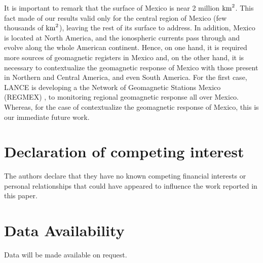\documentclass[a4paper,fleqn]{cas-dc}
\begin{document}

It is important to remark that the surface of Mexico is near 2 million ${\rm km}^2$. This fact made of our results valid only for the central region of Mexico (few thousands of ${\rm km}^2$), leaving the rest of its surface to address. In addition, Mexico is located at North America, and the ionospheric currents pass through and evolve along the whole American continent. Hence, on one hand, it is required more sources of geomagnetic registers in Mexico and, on the other hand, it is necessary to contextualize the geomagnetic response of Mexico with those present in Northern and Central America, and even South America. For the first case, LANCE is developing a the Network of Geomagnetic Stations Mexico (REGMEX) \citep[see][]{corona2024}, to monitoring regional geomagnetic response all over Mexico. Whereas, for the case of contextualize the geomagnetic response of Mexico, this is our immediate future work.

\printcredits
\section*{Declaration of competing interest}
\label{Declaration}
The authors declare that they have no known competing financial interests or personal relationships that could have appeared to
influence the work reported in this paper.
\section*{Data Availability}
\label{data_A}
Data will be made available on request.
\end{document}
